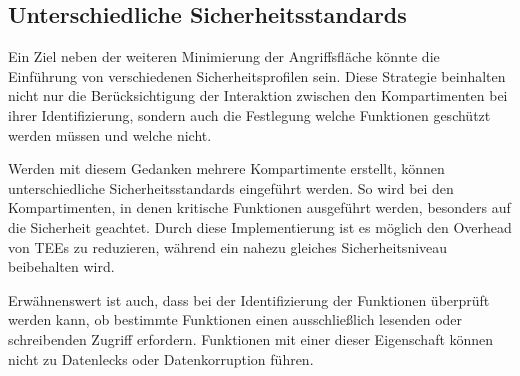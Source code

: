 \subsection{Unterschiedliche Sicherheitsstandards}
Ein Ziel neben der weiteren Minimierung der Angriffsfläche könnte die Einführung von verschiedenen Sicherheitsprofilen sein. Diese Strategie beinhalten nicht nur die Berücksichtigung der Interaktion zwischen den Kompartimenten bei ihrer Identifizierung, sondern auch die Festlegung welche Funktionen geschützt werden müssen und welche nicht.

Werden mit diesem Gedanken mehrere Kompartimente erstellt, können unterschiedliche Sicherheitsstandards eingeführt werden. So wird bei den Kompartimenten, in denen kritische Funktionen ausgeführt werden, besonders auf die Sicherheit geachtet. Durch diese Implementierung ist es möglich den Overhead von TEEs zu reduzieren, während ein nahezu gleiches Sicherheitsniveau beibehalten wird.

Erwähnenswert ist auch, dass bei der Identifizierung der Funktionen überprüft werden kann, ob bestimmte Funktionen einen ausschließlich lesenden oder schreibenden Zugriff erfordern. Funktionen mit einer dieser Eigenschaft können nicht zu Datenlecks oder Datenkorruption führen.